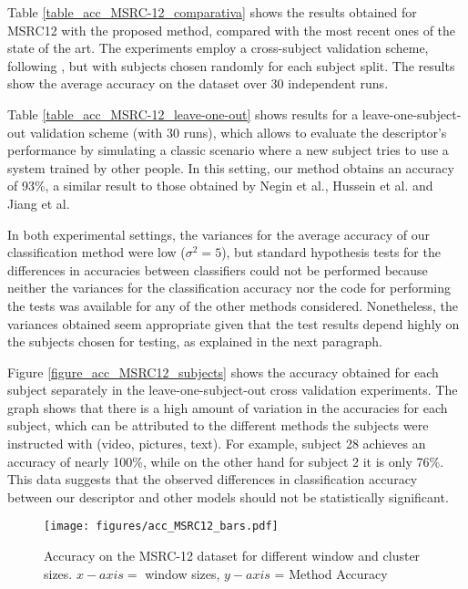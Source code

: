 \documentclass{fcs}
\begin{document}
Table \ref{table_acc_MSRC-12_comparativa} shows the results obtained for MSRC12 with the proposed method, compared with the most recent ones of the state of the art. The experiments employ a cross-subject validation scheme, following \cite{hussein2013human}, but with subjects chosen randomly for each subject split. The results show the average accuracy on the dataset over 30 independent runs. 




Table \ref{table_acc_MSRC-12_leave-one-out} shows results for a leave-one-subject-out validation scheme (with 30 runs), which allows to evaluate the descriptor's performance by simulating a classic scenario where a new subject tries to use a system trained by other people. In this setting, our method obtains an accuracy of 93\%, a similar result to those obtained by Negin et al., Hussein et al. and Jiang et al.


In both experimental settings, the variances for the average accuracy of our classification method were low ($\sigma^2=5$), but standard hypothesis tests for the differences in accuracies between classifiers could not be performed because neither the variances for the classification accuracy nor the code for performing the tests was available for any of the other methods considered. Nonetheless, the variances obtained seem appropriate given that the test results depend highly on the subjects chosen for testing, as explained in the next paragraph. 





Figure \ref{figure_acc_MSRC12_subjects} shows the accuracy obtained for each subject separately in the leave-one-subject-out cross validation experiments. The graph shows that there is a high amount of variation in the accuracies for each subject, which can be attributed to the different methods the subjects were instructed with (video, pictures, text). For example, subject 28 achieves an accuracy of nearly 100\%, while on the other hand for subject 2 it is only 76\%. This data suggests that the observed differences in classification accuracy between our descriptor and other models should not be statistically significant.





\begin{figure}
\texttt{[image: figures/acc\_MSRC12\_bars.pdf]}
\centering
\caption{Accuracy on the MSRC-12 dataset for different window and cluster sizes. $x-axis =$ window sizes, $y-axis$ = Method Accuracy}
\label{figure_acc_MSRC12_param}
\end{figure} 
\end{document}
